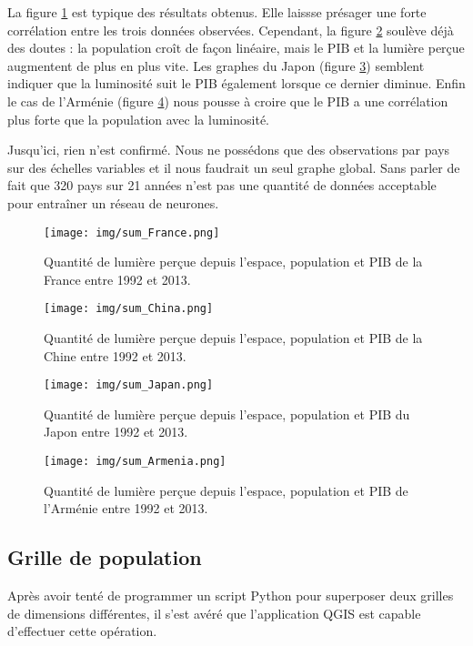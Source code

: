 \documentclass[a4paper]{report}
\begin{document}
La figure \ref{sum_France} est typique des résultats obtenus. Elle laissse présager une forte corrélation entre les trois données observées. Cependant, la figure \ref{sum_China} soulève déjà des doutes : la population croît de façon linéaire, mais le PIB et la lumière perçue augmentent de plus en plus vite. Les graphes du Japon (figure \ref{sum_Japan}) semblent indiquer que la luminosité suit le PIB également lorsque ce dernier diminue. Enfin le cas de l'Arménie (figure \ref{sum_Armenia}) nous pousse à croire que le PIB a une corrélation plus forte que la population avec la luminosité.

Jusqu'ici, rien n'est confirmé. Nous ne possédons que des observations par pays sur des échelles variables et il nous faudrait un seul graphe global. Sans parler de fait que 320 pays sur 21 années n'est pas une quantité de données acceptable pour entraîner un réseau de neurones.

\begin{figure}[h]
	\centering
	\texttt{[image: img/sum\_France.png]}
	\caption{Quantité de lumière perçue depuis l'espace, population et PIB de la France entre 1992 et 2013.}
	\label{sum_France}
\end{figure}


\begin{figure}[h]
	\centering
	\texttt{[image: img/sum\_China.png]}
	\caption{Quantité de lumière perçue depuis l'espace, population et PIB de la Chine entre 1992 et 2013.}
	\label{sum_China}
\end{figure}


\begin{figure}[h]
	\centering
	\texttt{[image: img/sum\_Japan.png]}
	\caption{Quantité de lumière perçue depuis l'espace, population et PIB du Japon entre 1992 et 2013.}
	\label{sum_Japan}
\end{figure}


\begin{figure}[h]
	\centering
	\texttt{[image: img/sum\_Armenia.png]}
	\caption{Quantité de lumière perçue depuis l'espace, population et PIB de l'Arménie entre 1992 et 2013.}
	\label{sum_Armenia}
\end{figure}

\subsection{Grille de population}

Après avoir tenté de programmer un script Python pour superposer deux grilles de dimensions différentes, il s'est avéré que l'application QGIS est capable d'effectuer cette opération.
\end{document}
